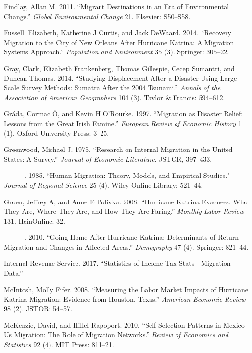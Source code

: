 \documentclass[]{article}
\begin{document}
\hypertarget{ref-findlay2011migrant}{}
Findlay, Allan M. 2011. ``Migrant Destinations in an Era of
Environmental Change.'' \emph{Global Environmental Change} 21. Elsevier:
S50--S58.

\hypertarget{ref-fussell2014recovery}{}
Fussell, Elizabeth, Katherine J Curtis, and Jack DeWaard. 2014.
``Recovery Migration to the City of New Orleans After Hurricane Katrina:
A Migration Systems Approach.'' \emph{Population and Environment} 35
(3). Springer: 305--22.

\hypertarget{ref-gray2014studying}{}
Gray, Clark, Elizabeth Frankenberg, Thomas Gillespie, Cecep Sumantri,
and Duncan Thomas. 2014. ``Studying Displacement After a Disaster Using
Large-Scale Survey Methods: Sumatra After the 2004 Tsunami.''
\emph{Annals of the Association of American Geographers} 104 (3). Taylor
\& Francis: 594--612.

\hypertarget{ref-grada1997migration}{}
Gráda, Cormac Ó, and Kevin H O'Rourke. 1997. ``Migration as Disaster
Relief: Lessons from the Great Irish Famine.'' \emph{European Review of
Economic History} 1 (1). Oxford University Press: 3--25.

\hypertarget{ref-greenwood1975research}{}
Greenwood, Michael J. 1975. ``Research on Internal Migration in the
United States: A Survey.'' \emph{Journal of Economic Literature}. JSTOR,
397--433.

\hypertarget{ref-greenwood1985human}{}
---------. 1985. ``Human Migration: Theory, Models, and Empirical
Studies.'' \emph{Journal of Regional Science} 25 (4). Wiley Online
Library: 521--44.

\hypertarget{ref-groen2008hurricane}{}
Groen, Jeffrey A, and Anne E Polivka. 2008. ``Hurricane Katrina
Evacuees: Who They Are, Where They Are, and How They Are Faring.''
\emph{Monthly Labor Review} 131. HeinOnline: 32.

\hypertarget{ref-groen2010going}{}
---------. 2010. ``Going Home After Hurricane Katrina: Determinants of
Return Migration and Changes in Affected Areas.'' \emph{Demography} 47
(4). Springer: 821--44.

\hypertarget{ref-irsmigdata}{}
Internal Revenue Service. 2017. ``Statistics of Income Tax Stats -
Migration Data.''

\hypertarget{ref-mcintosh2008measuring}{}
McIntosh, Molly Fifer. 2008. ``Measuring the Labor Market Impacts of
Hurricane Katrina Migration: Evidence from Houston, Texas.''
\emph{American Economic Review} 98 (2). JSTOR: 54--57.

\hypertarget{ref-mckenzie2010self}{}
McKenzie, David, and Hillel Rapoport. 2010. ``Self-Selection Patterns in
Mexico-Us Migration: The Role of Migration Networks.'' \emph{Review of
Economics and Statistics} 92 (4). MIT Press: 811--21.
\end{document}
